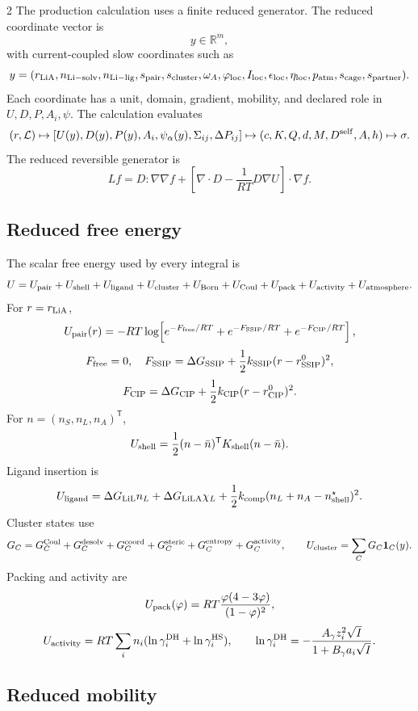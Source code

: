 \documentclass[10pt]{article}
\newcommand{\R}{\mathbb{R}}
\newcommand{\T}{\mathsf{T}}
\newcommand{\one}{\mathbf{1}}
\begin{document}
\begin{multicols}{2}
The production calculation uses a finite reduced generator. The reduced
coordinate vector is
\[
y\in\R^m,
\]
with current-coupled slow coordinates such as
\[
y=
(r_{\rm LiA},n_{\rm Li-solv},n_{\rm Li-lig},s_{\rm pair},
s_{\rm cluster},\omega_A,\varphi_{\rm loc},I_{\rm loc},
\epsilon_{\rm loc},\eta_{\rm loc},p_{\rm atm},s_{\rm cage},
s_{\rm partner}).
\]
Each coordinate has a unit, domain, gradient, mobility, and declared role in
\(U,D,P,A_i,\psi\). The calculation evaluates
\[
(r,\mathcal L)
\mapsto
[U(y),D(y),P(y),A_i,\psi_\alpha(y),\Sigma_{ij},\Delta P_{ij}]
\mapsto
(c,K,Q,d,M,D^{\rm self},A,h)
\mapsto
\sigma .
\]
The reduced reversible generator is
\[
L f
=
D:\nabla\nabla f
+
\left[
\nabla\cdot D-\frac{1}{RT}D\nabla U
\right]\cdot\nabla f .
\]

\subsection{Reduced free energy}

The scalar free energy used by every integral is
\[
U=
U_{\rm pair}+U_{\rm shell}+U_{\rm ligand}+U_{\rm cluster}
+U_{\rm Born}+U_{\rm Coul}+U_{\rm pack}+U_{\rm activity}
+U_{\rm atmosphere}.
\]
For \(r=r_{\rm LiA}\),
\[
U_{\rm pair}(r)
=
-RT\log\!\left[
e^{-F_{\rm free}/RT}
+e^{-F_{\rm SSIP}/RT}
+e^{-F_{\rm CIP}/RT}
\right],
\]
\[
F_{\rm free}=0,
\quad
F_{\rm SSIP}=\Delta G_{\rm SSIP}
+\frac12k_{\rm SSIP}(r-r_{\rm SSIP}^0)^2,
\]
\[
F_{\rm CIP}=\Delta G_{\rm CIP}
+\frac12k_{\rm CIP}(r-r_{\rm CIP}^0)^2.
\]
For \(n=(n_S,n_L,n_A)^\T\),
\[
U_{\rm shell}=\frac12(n-\bar n)^\T K_{\rm shell}(n-\bar n).
\]
Ligand insertion is
\[
U_{\rm ligand}
=
\Delta G_{\rm LiL}n_L+\Delta G_{\rm LiLA}\chi_L
+\frac12k_{\rm comp}(n_L+n_A-n_{\rm shell}^\star)^2.
\]
Cluster states use
\[
G_C=
G_C^{\rm Coul}+G_C^{\rm desolv}+G_C^{\rm coord}
+G_C^{\rm steric}+G_C^{\rm entropy}+G_C^{\rm activity},
\qquad
U_{\rm cluster}=\sum_CG_C\one_C(y).
\]
Packing and activity are
\[
U_{\rm pack}(\varphi)
=
RT\frac{\varphi(4-3\varphi)}{(1-\varphi)^2},
\]
\[
U_{\rm activity}
=
RT\sum_i n_i(\ln\gamma_i^{\rm DH}+\ln\gamma_i^{\rm HS}),
\qquad
\ln\gamma_i^{\rm DH}
=
-\frac{A_\gamma z_i^2\sqrt I}{1+B_\gamma a_i\sqrt I}.
\]

\subsection{Reduced mobility}


\end{multicols}
\end{document}
